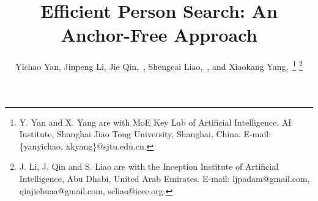\documentclass[journal]{IEEEtran}
\begin{document}
\title{Efficient Person Search: An Anchor-Free Approach}


\author{Yichao Yan,
        Jinpeng Li,
        Jie Qin,~,
        Shengcai Liao,~,
        and {Xiaokang Yang},~\thanks{Y. Yan and X. Yang are with MoE Key Lab of Artificial Intelligence, AI Institute, Shanghai Jiao Tong University, Shanghai, China. E-mail: \{yanyichao, xkyang\}@sjtu.edu.cn.} \thanks{J. Li, J. Qin and S. Liao are with the Inception Institute of Artificial Intelligence, Abu Dhabi, United Arab Emirates. E-mail: ljpadam@gmail.com, qinjiebuaa@gmail.com, scliao@ieee.org.}


}




















\maketitle
\end{document}
